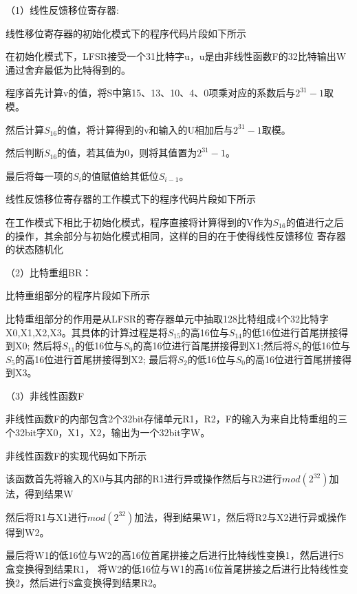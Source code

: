 \documentclass[a4paper,11pt,UTF8]{ctexart}
\begin{document}
      （1）线性反馈移位寄存器:\par
        线性移位寄存器的初始化模式下的程序代码片段如下所示\par
        
        在初始化模式下，LFSR接受一个31比特字u，u是由非线性函数F的32比特输出W通过舍弃最低为比特得到的。\par
        程序首先计算v的值，将S中第15、13、10、4、0项乘对应的系数后与$2^{31}-1$取模。\par
        然后计算$S_{16}$的值，将计算得到的v和输入的U相加后与$2^{31}-1$取模。\par
        然后判断$S_{16}$的值，若其值为0，则将其值置为$2^{31}-1$。\par
        最后将每一项的$S_{i}$的值赋值给其低位$S_{i-1}$。\par
        线性反馈移位寄存器的工作模式下的程序代码片段如下所示
        
        在工作模式下相比于初始化模式，程序直接将计算得到的V作为$S_{16}$的值进行之后的操作，其余部分与初始化模式相同，这样的目的在于使得线性反馈移位
        寄存器的状态随机化\par

      （2）比特重组BR：\par
        比特重组部分的程序片段如下所示\par
        
        比特重组部分的作用是从LFSR的寄存器单元中抽取128比特组成4个32比特字X0,X1,X2,X3。其具体的计算过程是将$S_{15}$的高16位与$S_{14}$的低16位进行首尾拼接得到X0;
        然后将$S_{11}$的低16位与$S_{9}$的高16位进行首尾拼接得到X1;然后将$S_{7}$的低16位与$S_{5}$的高16位进行首尾拼接得到X2;
        最后将$S_{2}$的低16位与$S_{0}$的高16位进行首尾拼接得到X3。\par

      （3）非线性函数F\par
        非线性函数F的内部包含2个32bit存储单元R1，R2，F的输入为来自比特重组的三个32bit字X0，X1，X2，输出为一个32bit字W。\par
        非线性函数F的实现代码如下所示
        \par
        该函数首先将输入的X0与其内部的R1进行异或操作然后与R2进行$mod(2^{32})$加法，得到结果W\par
        然后将R1与X1进行$mod(2^{32})$加法，得到结果W1，然后将R2与X2进行异或操作得到W2。\par
        最后将W1的低16位与W2的高16位首尾拼接之后进行比特线性变换1，然后进行S盒变换得到结果R1，
        将W2的低16位与W1的高16位首尾拼接之后进行比特线性变换2，然后进行S盒变换得到结果R2。\par
\end{document}
